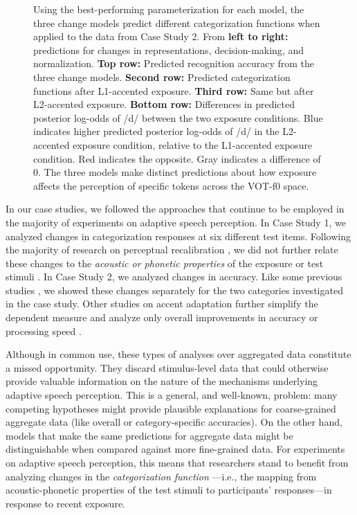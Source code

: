 \documentclass[
  11pt,
  man,floatsintext]{apa6}
\begin{document}
\begin{figure}
{}

\caption{Using the best-performing parameterization for each model, the three change models predict different categorization functions when applied to the data from Case Study 2. From \textbf{left to right:} predictions for changes in representations, decision-making, and normalization. \textbf{Top row:} Predicted recognition accuracy from the three change models. \textbf{Second row:} Predicted categorization functions after L1-accented exposure. \textbf{Third row:} Same but after L2-accented exposure. \textbf{Bottom row:} Differences in predicted posterior log-odds of /d/ between the two exposure conditions. Blue indicates higher predicted posterior log-odds of /d/ in the L2-accented exposure condition, relative to the L1-accented exposure condition. Red indicates the opposite. Gray indicates a difference of 0. The three models make distinct predictions about how exposure affects the perception of specific tokens across the VOT-f0 space.}\label{fig:show-model-categorization-3D-plots-best-performing}
\end{figure}

In our case studies, we followed the approaches that continue to be employed in the majority of experiments on adaptive speech perception. In Case Study 1, we analyzed changes in categorization responses at six different test items. Following the majority of research on perceptual recalibration \autocites[for exceptions, see][]{drouin2016,saltzman-myers2021}, we did not further relate these changes to the \emph{acoustic or phonetic properties} of the exposure or test stimuli \autocites[for related discussion, see also][]{clayards2018,theodore2021}. In Case Study 2, we analyzed changes in accuracy. Like some previous studies \autocites[e.g.,][]{xie2016jep,zheng-samuel2020}, we showed these changes separately for the two categories investigated in the case study. Other studies on accent adaptation further simplify the dependent measure and analyze only overall improvements in accuracy \autocite{bradlow-bent2008,sidaras2009,tzeng2016} or processing speed \autocite{clarke-garrett2004}.

Although in common use, these types of analyses over aggregated data constitute a missed opportunity. They discard stimulus-level data that could otherwise provide valuable information on the nature of the mechanisms underlying adaptive speech perception. This is a general, and well-known, problem: many competing hypotheses might provide plausible explanations for coarse-grained aggregate data (like overall or category-specific accuracies). On the other hand, models that make the same predictions for aggregate data might be distinguishable when compared against more fine-grained data. For experiments on adaptive speech perception, this means that researchers stand to benefit from analyzing changes in the \emph{categorization function} ---i.e., the mapping from acoustic-phonetic properties of the test stimuli to participants' responses---in response to recent exposure.
\end{document}
